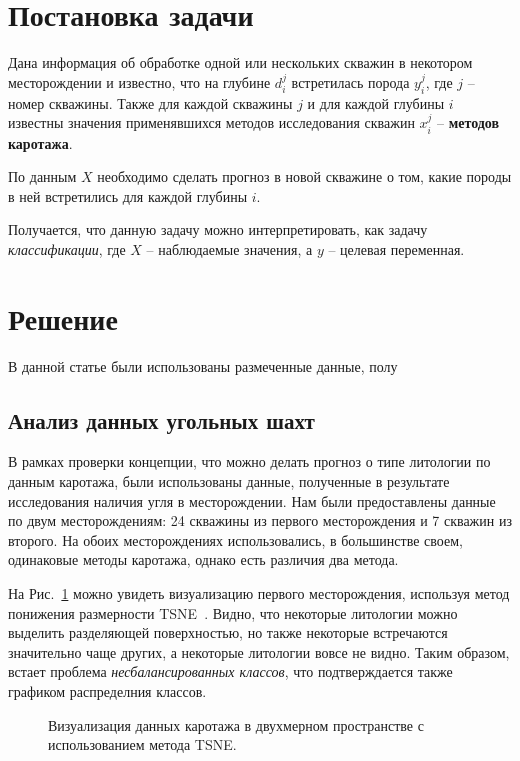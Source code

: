 \documentclass[aps,%
12pt,%
final,%
oneside,
onecolumn,%
musixtex, %
superscriptaddress,%
centertags]{article} %
\begin{document}
\section{Постановка задачи}
Дана информация об обработке одной или нескольких скважин в некотором месторождении и известно, что на глубине $d^j_i$ встретилась порода $y^j_i$, где $j$ -- номер скважины. Также для каждой скважины $j$ и для каждой глубины $i$ известны значения применявшихся методов исследования скважин $x^j_i$ -- \textbf{методов каротажа}.

По данным $X$ необходимо сделать прогноз в новой скважине о том, какие породы в ней встретились для каждой глубины $i$.

Получается, что данную задачу можно интерпретировать, как задачу \textit{классификации}, где $X$ -- наблюдаемые значения, а $y$ -- целевая переменная.

\section{Решение}

В данной статье были использованы размеченные данные, полу

\subsection{Анализ данных угольных шахт}

В рамках проверки концепции, что можно делать прогноз о типе литологии по данным каротажа, были использованы данные, полученные в результате исследования наличия угля в месторождении. Нам были предоставлены данные по двум месторождениям: 24 скважины из первого месторождения и 7 скважин из второго. На обоих месторождениях использовались, в большинстве своем, одинаковые методы каротажа, однако есть различия два метода.

На Рис.~\ref{first-deposit-visualisation} можно увидеть визуализацию первого месторождения, используя метод понижения размерности TSNE~\cite{tsne-basic}. Видно, что некоторые литологии можно выделить разделяющей поверхностью, но также некоторые встречаются значительно чаще других, а некоторые литологии вовсе не видно. Таким образом, встает проблема \textit{несбалансированных классов}, что подтверждается также графиком распределния классов.
\begin{figure}[ht]
\begin{center}


\caption{
\label{first-deposit-visualisation}
     Визуализация данных каротажа в двухмерном пространстве с использованием метода TSNE.}
\end {center}
\end {figure}
\end{document}
